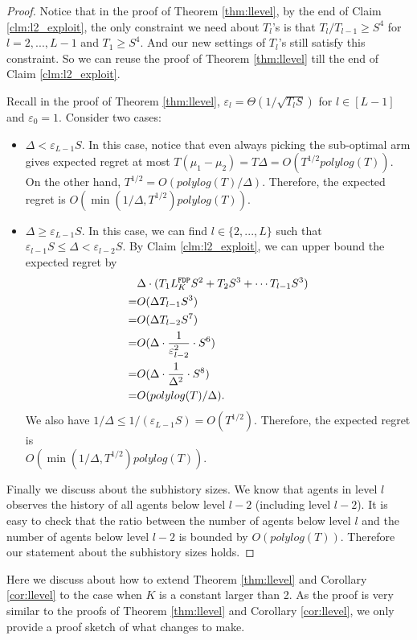 \begin{proof}
Notice that in the proof of Theorem \ref{thm:llevel}, by the end of Claim \ref{clm:l2_exploit}, the only constraint we need about $T_l$'s is that $T_l / T_{l-1} \geq S^4$ for $l=2,...,L-1$ and $T_1 \geq S^4$. And our new settings of $T_l$'s still satisfy this constraint. So we can reuse the proof of Theorem \ref{thm:llevel} till the end of Claim \ref{clm:l2_exploit}.

Recall in the proof of Theorem \ref{thm:llevel}, $\varepsilon_l =\Theta(1/\sqrt{T_l S})$ for $l \in [L-1]$ and $\varepsilon_0 = 1$. Consider two cases:
\begin{itemize}
\item $\Delta < \varepsilon_{L-1} S$. In this case, notice that even always picking the sub-optimal arm gives expected regret at most $T(\mu_1-\mu_2) = T\Delta = O(T^{1/2} polylog(T))$. On the other hand, $T^{1/2} = O(polylog(T)/\Delta)$. Therefore, the expected regret is $O(\min(1/\Delta, T^{1/2})polylog(T))$.
\item $\Delta \geq \varepsilon_{L-1} S$. In this case, we can find $l \in \{2,...,L\}$ such that $\varepsilon_{l-1} S\leq \Delta < \varepsilon_{l-2} S$. By Claim \ref{clm:l2_exploit}, we can upper bound the expected regret by
\begin{align*}
&\Delta \cdot (T_1 L^\mathtt{FDP}_K S^2  +T_2 S^3+ \cdots T_{l-1} S^3)\\
=& O(\Delta T_{l-1}S^3) \\
=&O(\Delta T_{l-2}S^7) \\
=&O(\Delta\cdot  \frac{1}{\varepsilon^2_{l-2}}\cdot S^6)\\
=&O(\Delta \cdot \frac{1}{\Delta^2}\cdot S^8)\\
=&O(polylog(T)/\Delta).
\end{align*}
We also have $1/\Delta \leq 1/(\varepsilon_{L-1}S)= O(T^{1/2})$. Therefore, the expected regret is \\$O(\min(1/\Delta, T^{1/2})polylog(T))$.
\end{itemize}

Finally we discuss about the subhistory sizes. We know that agents in level $l$ observes the history of all agents below level $l-2$ (including level $l-2$). It is easy to check that the ratio between the number of agents below level $l$ and the number of agents below level $l-2$ is bounded by $O(polylog(T))$. Therefore our statement about the subhistory sizes holds.
\end{proof}

Here we discuss about how to extend Theorem \ref{thm:llevel} and Corollary \ref{cor:llevel} to the case when $K$ is a constant larger than 2. As the proof is very similar to the proofs of Theorem \ref{thm:llevel} and Corollary \ref{cor:llevel}, we only provide a proof sketch of what changes to make.

